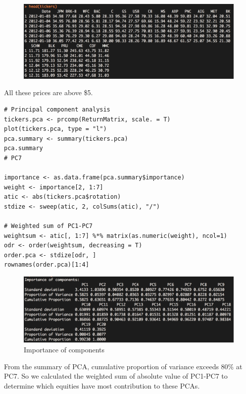 \documentclass{article}
\begin{document}
\begin{figure}[h] 
\begin{center} 
\includegraphics[width = 15cm]{headticker.png}  
\caption{} 
\end{center} 
\end{figure}
 All these prices are above \$5.
 
\begin{verbatim}
# Principal component analysis
tickers.pca <- prcomp(ReturnMatrix, scale. = T)
plot(tickers.pca, type = "l")
pca.summary <- summary(tickers.pca)
pca.summary
# PC7

importance <- as.data.frame(pca.summary$importance)
weight <- importance[2, 1:7]
atic <- abs(tickers.pca$rotation)
stdize <- sweep(atic, 2, colSums(atic), "/")

# Weighted sum of PC1-PC7
weightsum <- atic[, 1:7] %*% matrix(as.numeric(weight), ncol=1)
odr <- order(weightsum, decreasing = T)
order.pca <- stdize[odr, ]
rownames(order.pca)[1:4]
\end{verbatim}

\begin{figure}[h] 
\begin{center} 
\includegraphics[width = 15cm]{importance.png}  
\caption{Importance of components} 
\end{center} 
\end{figure}
From the summary of PCA, cumulative proportion of variance exceeds 80\% at PC7. So we calculated the weighted sum of absolute value of PC1-PC7 to determine which equities have most contribution to these PCAs. \\
\end{document}

